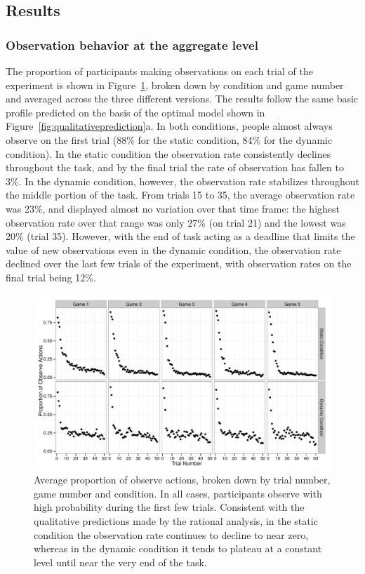 \documentclass[authoryear]{elsarticle}
\newcommand{\subsectionX}[1]{\subsection{#1}}
\newcommand{\subsubsectionX}[1]{\subsubsection{#1}}
\begin{document}
\subsectionX{Results}


\subsubsectionX{Observation behavior at the aggregate level}

The proportion of participants making observations on each trial of the experiment is shown in Figure~\ref{fig:obsByGame}, broken down by condition and game number and averaged across the three different versions. The results follow the same basic profile predicted on the basis of the optimal model shown in Figure~\ref{fig:qualitativeprediction}a. In both conditions, people almost always observe on the first trial (88\% for the static condition, 84\% for the dynamic condition). In the static condition the observation rate consistently declines throughout the task, and by the final trial the rate of observation has fallen to 3\%. In the dynamic condition, however, the observation rate stabilizes throughout the middle portion of the task. From trials 15 to 35, the average observation rate was 23\%, and displayed almost no variation over that time frame: the highest observation rate over that range was only 27\% (on trial 21) and the lowest was 20\% (trial 35). However, with the end of task acting as a deadline that limits the value of new observations even in the dynamic condition, the observation rate declined over the last few trials of the experiment, with observation rates on the final trial being 12\%.

\begin{figure}[p]
\begin{center}
\includegraphics[scale=.6]{obsByGame.pdf}
\caption{Average proportion of observe actions, broken down by trial number, game number and condition. In all cases, participants observe with high probability during the first few trials. Consistent with the qualitative predictions made by the rational analysis, in the static condition the observation rate continues to decline to near zero, whereas in the dynamic condition it tends to plateau at a constant level until near the very end of the task.}
\label{fig:obsByGame}
\end{center}
\end{figure}
\end{document}
